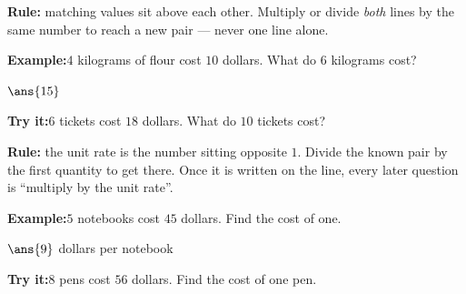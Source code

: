 \documentclass[12pt]{article}
\begin{document}
\begin{formulabox}
\textbf{Rule:} matching values sit above each other. Multiply or divide
\emph{both} lines by the same number to reach a new pair --- never one line
alone.
\begin{center}
\end{center}
\end{formulabox}
\begin{examplebox}
\textbf{Example:}\quad $4$ kilograms of flour cost $10$ dollars. What do $6$
kilograms cost?
\par
$\ans{15}$
\end{examplebox}
\begin{tryitbox}
\textbf{Try it:}\quad $6$ tickets cost $18$ dollars. What do $10$ tickets
cost?\\[2pt]
\end{tryitbox}

\begin{formulabox}
\textbf{Rule:} the unit rate is the number sitting opposite $1$. Divide the
known pair by the first quantity to get there. Once it is written on the line,
every later question is ``multiply by the unit rate''.
\end{formulabox}
\begin{examplebox}
\textbf{Example:}\quad $5$ notebooks cost $45$ dollars. Find the cost of one.
\par
$\ans{9}$ dollars per notebook
\end{examplebox}
\begin{tryitbox}
\textbf{Try it:}\quad $8$ pens cost $56$ dollars. Find the cost of one pen.
\\[2pt]
\end{tryitbox}
\end{document}
